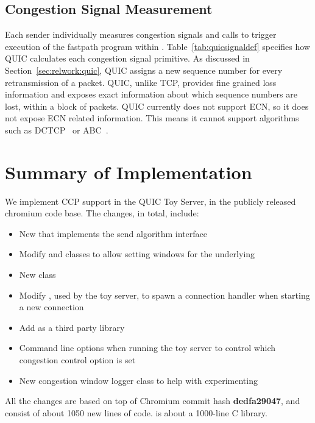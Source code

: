 \subsection{Congestion Signal Measurement}
\label{sec:impl:congestion_signals}

Each sender individually measures congestion signals and calls  to trigger execution of the fastpath program within \libccp.
Table~\ref{tab:quicsignaldef} specifies how QUIC calculates each congestion signal primitive.
As discussed in Section~\ref{sec:relwork:quic}, QUIC assigns a new sequence number for every retransmission of a packet.
QUIC, unlike TCP, provides fine grained loss information and exposes exact information about which sequence numbers are lost, within a block of packets.
QUIC currently does not support ECN, so it does not expose ECN related information.
This means it cannot support algorithms such as DCTCP~\cite{dctcp} or ABC~\cite{abc}.

\section{Summary of Implementation}
\label{sec:impl:summary}
\label{impl_summary}
We implement CCP support in the QUIC Toy Server, in the publicly released chromium code base.
The changes, in total, include:
\begin{itemize}
    \item New  that implements the send algorithm interface
    \item Modify  and  classes to allow setting windows for the underlying 
    \item New  class
    \item Modify , used by the toy server, to spawn a connection handler when starting a new connection
    \item Add  as a third party library
    \item Command line options when running the toy server to control which congestion control option is set
    \item New congestion window logger class to help with experimenting
\end{itemize}
All the changes are based on top of Chromium commit hash \textbf{dedfa29047}, and consist of about 1050 new lines of code.
 is about a 1000-line C library.
 
